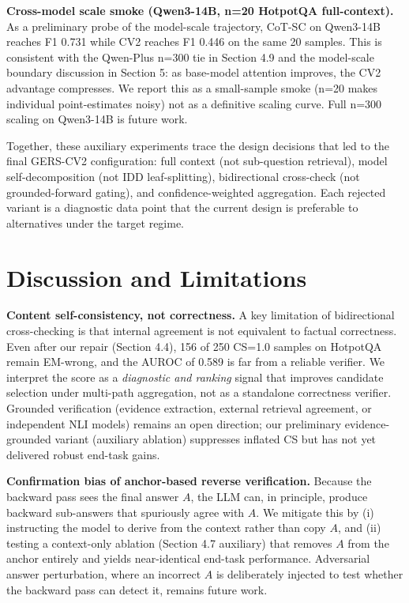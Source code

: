 \documentclass[11pt,a4paper]{article}
\begin{document}
\textbf{Cross-model scale smoke (Qwen3-14B, n=20 HotpotQA full-context).} As a preliminary probe of the model-scale trajectory, CoT-SC on Qwen3-14B reaches F1 0.731 while CV2 reaches F1 0.446 on the same 20 samples. This is consistent with the Qwen-Plus n=300 tie in Section 4.9 and the model-scale boundary discussion in Section 5: as base-model attention improves, the CV2 advantage compresses. We report this as a small-sample smoke (n=20 makes individual point-estimates noisy) not as a definitive scaling curve. Full n=300 scaling on Qwen3-14B is future work.

Together, these auxiliary experiments trace the design decisions that led to the final GERS-CV2 configuration: full context (not sub-question retrieval), model self-decomposition (not IDD leaf-splitting), bidirectional cross-check (not grounded-forward gating), and confidence-weighted aggregation. Each rejected variant is a diagnostic data point that the current design is preferable to alternatives under the target regime.

\section{Discussion and Limitations}

\textbf{Content self-consistency, not correctness.} A key limitation of bidirectional cross-checking is that internal agreement is not equivalent to factual correctness. Even after our repair (Section 4.4), 156 of 250 CS=1.0 samples on HotpotQA remain EM-wrong, and the AUROC of 0.589 is far from a reliable verifier. We interpret the score as a \emph{diagnostic and ranking} signal that improves candidate selection under multi-path aggregation, not as a standalone correctness verifier. Grounded verification (evidence extraction, external retrieval agreement, or independent NLI models) remains an open direction; our preliminary evidence-grounded variant (auxiliary ablation) suppresses inflated CS but has not yet delivered robust end-task gains.

\textbf{Confirmation bias of anchor-based reverse verification.} Because the backward pass sees the final answer $A$, the LLM can, in principle, produce backward sub-answers that spuriously agree with $A$. We mitigate this by (i) instructing the model to derive from the context rather than copy $A$, and (ii) testing a context-only ablation (Section 4.7 auxiliary) that removes $A$ from the anchor entirely and yields near-identical end-task performance. Adversarial answer perturbation, where an incorrect $A$ is deliberately injected to test whether the backward pass can detect it, remains future work.
\end{document}

